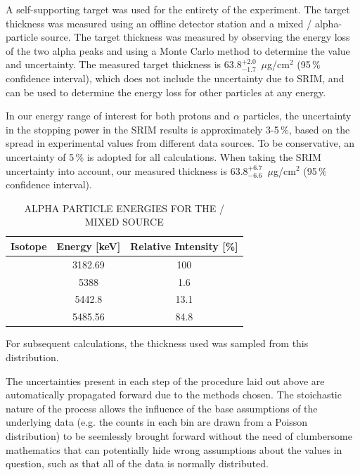 A self-supporting  target was used for the entirety of the
experiment. The target thickness was measured using an offline detector
station and a mixed / alpha-particle source. The
target thickness was measured by observing the energy loss of the two
alpha peaks and using a Monte Carlo method to determine the value and
uncertainty. The measured target thickness is
$63.8^{+2.0}_{-1.7}$~$\mu$g/cm${}^{2}$ (95\,\% confidence interval), which does
not include the uncertainty due to SRIM, and can be used to determine the
energy loss for other particles at any energy.

In our energy range of interest for both protons and $\alpha$ particles, the
uncertainty in the stopping power in the SRIM results is approximately 3-5\,\%,
based on the spread in experimental values from different data sources. To be
conservative, an uncertainty of 5\,\% is adopted for all calculations. When
taking the SRIM uncertainty into account, our measured thickness is
$63.8^{+6.7}_{-6.6}$~$\mu$g/cm${}^{2}$ (95\,\% confidence interval).


\begin{table}
    \begin{center}
        \caption{ALPHA PARTICLE ENERGIES FOR THE /
            MIXED SOURCE}
        \label{tab:mixed-source}
        \begin{tabular}{rS[table-format=2.4]S[table-format=2.4]}
            \toprule
            \midrule
            {\textbf{Isotope}} & {\textbf{Energy [keV]}} &
                {\textbf{Relative Intensity [\%]}} \\
            \midrule
             & 3182.69 & 100   \\
             & 5388    &   1.6 \\
                          & 5442.8  &  13.1 \\
                          & 5485.56 &  84.8 \\
            \bottomrule
        \end{tabular}
    \end{center}
\end{table}

For subsequent calculations, the
thickness used was sampled from this distribution.

The uncertainties present in each step of the procedure laid out above
are automatically propagated forward due to the methods chosen. The
stoichastic nature of the process allows the influence of the base
assumptions of the underlying data (e.g. the counts in each bin are
drawn from a Poisson distribution) to be seemlessly brought forward
without the need of clumbersome mathematics that can potentially hide
wrong assumptions about the values in question, such as that all of the
data is normally distributed.

